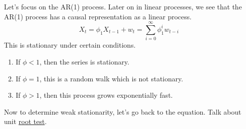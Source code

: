 \documentclass{article}
\begin{document}
  \begin{example}[AR(1) Processes]
    \label{ex:ar-1-processes}
    Let's focus on the AR(1) process. Later on in linear processes, we see that the AR(1) process has a causal representation as a linear process. 
    \begin{equation}
      X_t = \phi_1 X_{t-1} + w_t = \sum_{i=0}^\infty \phi_1^i w_{t-i}
    \end{equation}
    This is stationary under certain conditions. 
    \begin{enumerate}
      \item If $\phi < 1$, then the series is stationary. 
      \item If $\phi = 1$, this is a random walk which is not stationary. 
      \item If $\phi > 1$, then this process grows exponentially fast. 
    \end{enumerate}
  \end{example}

  Now to determine weak stationarity, let's go back to the equation. Talk about unit \hyperref[real-thm:root-test]{root test}. 
\end{document}
